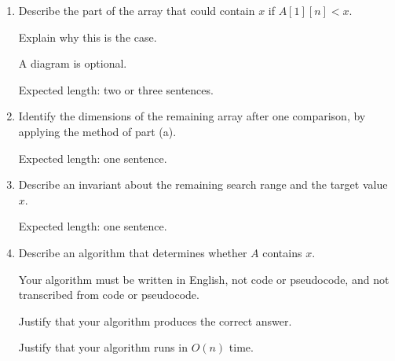 \documentclass[12pt]{article}
\begin{document}
\newpage
\begin{rubric}
\begin{enumerate}
    \item Describe the part of the array that could contain $x$ if $A[1][n] < x$.
        
    Explain why this is the case.
    
    A diagram is optional.
    
    Expected length: two or three sentences.
    \item Identify the dimensions of the remaining array after one comparison, by applying the method of part (a).
    
    Expected length: one sentence.
    \item  Describe an invariant about the remaining search range and the target value $x$.
    
    Expected length: one sentence.
    \item Describe an algorithm that determines whether $A$ contains $x$.
    
    Your algorithm must be written in English, not code or pseudocode, and not transcribed from code or pseudocode.
    
    Justify that your algorithm produces the correct answer.
    
    Justify that your algorithm runs in $O(n)$ time.
\end{enumerate}
\end{rubric}

\begin{solution}
\end{solution}

\begin{attribution}
\end{attribution}
\end{document}
